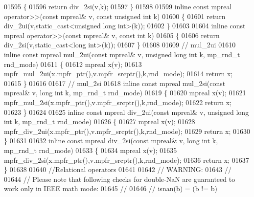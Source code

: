 \begin{DoxyCode}
01595 \{
01596     \textcolor{keywordflow}{return} div\_2si(v,k);
01597 \}
01598 
01599 \textcolor{keyword}{inline} \textcolor{keyword}{const} mpreal operator>>(\textcolor{keyword}{const} mpreal& v, \textcolor{keyword}{const} \textcolor{keywordtype}{unsigned} \textcolor{keywordtype}{int} k)
01600 \{
01601     \textcolor{keywordflow}{return} div\_2ui(v,static\_cast<unsigned long int>(k));
01602 \}
01603 
01604 \textcolor{keyword}{inline} \textcolor{keyword}{const} mpreal operator>>(\textcolor{keyword}{const} mpreal& v, \textcolor{keyword}{const} \textcolor{keywordtype}{int} k)
01605 \{
01606     \textcolor{keywordflow}{return} div\_2si(v,static\_cast<long int>(k));
01607 \}
01608 
01609 \textcolor{comment}{// mul\_2ui}
01610 \textcolor{keyword}{inline} \textcolor{keyword}{const} mpreal mul\_2ui(\textcolor{keyword}{const} mpreal& v, \textcolor{keywordtype}{unsigned} \textcolor{keywordtype}{long} \textcolor{keywordtype}{int} k, mp\_rnd\_t rnd\_mode)
01611 \{
01612     mpreal x(v);
01613     mpfr\_mul\_2ui(x.mpfr\_ptr(),v.mpfr\_srcptr(),k,rnd\_mode);
01614     \textcolor{keywordflow}{return} x;
01615 \}
01616 
01617 \textcolor{comment}{// mul\_2si}
01618 \textcolor{keyword}{inline} \textcolor{keyword}{const} mpreal mul\_2si(\textcolor{keyword}{const} mpreal& v, \textcolor{keywordtype}{long} \textcolor{keywordtype}{int} k, mp\_rnd\_t rnd\_mode)
01619 \{
01620     mpreal x(v);
01621     mpfr\_mul\_2si(x.mpfr\_ptr(),v.mpfr\_srcptr(),k,rnd\_mode);
01622     \textcolor{keywordflow}{return} x;
01623 \}
01624 
01625 \textcolor{keyword}{inline} \textcolor{keyword}{const} mpreal div\_2ui(\textcolor{keyword}{const} mpreal& v, \textcolor{keywordtype}{unsigned} \textcolor{keywordtype}{long} \textcolor{keywordtype}{int} k, mp\_rnd\_t rnd\_mode)
01626 \{
01627     mpreal x(v);
01628     mpfr\_div\_2ui(x.mpfr\_ptr(),v.mpfr\_srcptr(),k,rnd\_mode);
01629     \textcolor{keywordflow}{return} x;
01630 \}
01631 
01632 \textcolor{keyword}{inline} \textcolor{keyword}{const} mpreal div\_2si(\textcolor{keyword}{const} mpreal& v, \textcolor{keywordtype}{long} \textcolor{keywordtype}{int} k, mp\_rnd\_t rnd\_mode)
01633 \{
01634     mpreal x(v);
01635     mpfr\_div\_2si(x.mpfr\_ptr(),v.mpfr\_srcptr(),k,rnd\_mode);
01636     \textcolor{keywordflow}{return} x;
01637 \}
01638 
01640 \textcolor{comment}{//Relational operators}
01641 
01642 \textcolor{comment}{// WARNING:}
01643 \textcolor{comment}{//}
01644 \textcolor{comment}{// Please note that following checks for double-NaN are guaranteed to work only in IEEE math mode:}
01645 \textcolor{comment}{//}
01646 \textcolor{comment}{// isnan(b) =  (b != b)}

\end{DoxyCode}
